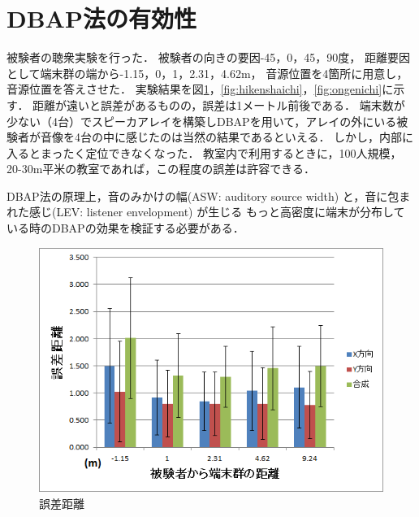 \section{DBAP法の有効性}


被験者の聴衆実験を行った．
被験者の向きの要因-45，0，45，90度，
距離要因として端末群の端から-1.15，0，1，2.31，4.62m，
音源位置を4箇所に用意し，音源位置を答えさせた．
実験結果を図\ref{fig:gosa}，\ref{fig:hikenshaichi}，\ref{fig:ongenichi}に示す．
距離が遠いと誤差があるものの，誤差は1メートル前後である．
端末数が少ない（4台）でスピーカアレイを構築しDBAPを用いて，アレイの外にいる被験者が音像を4台の中に感じたのは当然の結果であるといえる．
しかし，内部に入るとまったく定位できなくなった．
教室内で利用するときに，100人規模，20-30m平米の教室であれば，この程度の誤差は許容できる．


DBAP法の原理上，音のみかけの幅(ASW: auditory source width) と，音に包まれた感じ(LEV: listener envelopment) が生じる\cite{ku-kanonkyo, onbasaigen, onkyoukougaku, 森本政之09, 森本政之90, 森本政之93, 崔瑛芝, 上杉信敏, 田中雅史}
もっと高密度に端末が分布している時のDBAPの効果を検証する必要がある．


\begin{figure}[p]
  \centering
  \includegraphics[clip,width=1.05\hsize]{img/zikken.png}
  \caption{誤差距離}\label{fig:gosa}
\end{figure}



